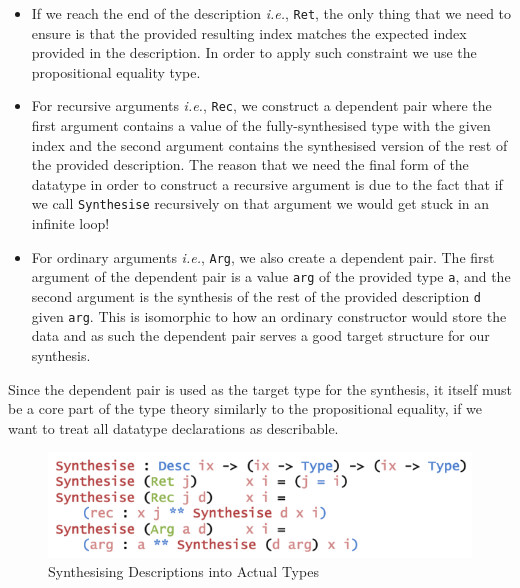\documentclass{ituthesis}
\newcommand{\ttconstructor}[1]{\textcolor{constructor-color}{\texttt{#1}}}
\newcommand{\ttdec}[1]{\textcolor{declared-var-color}{\texttt{#1}}}
\newcommand{\ttvar}[1]{\textcolor{local-var-color}{\texttt{#1}}}
\theoremstyle{break}
\begin{document}
\begin{itemize}
  \item If we reach the end of the description \textit{i.e.}, \ttconstructor{Ret}, the only thing that we need to ensure is that the provided resulting index matches the expected index provided in the description. In order to apply such constraint we use the propositional equality type.
  \item For recursive arguments \textit{i.e.}, \ttconstructor{Rec}, we construct a dependent pair where the first argument contains a value of the fully-synthesised type with the given index and the second argument contains the synthesised version of the rest of the provided description. The reason that we need the final form of the datatype in order to construct a recursive argument is due to the fact that if we call \ttdec{Synthesise} recursively on that argument we would get stuck in an infinite loop!
  \item For ordinary arguments \textit{i.e.}, \ttconstructor{Arg}, we also create a dependent pair. The first argument of the dependent pair is a value \ttvar{arg} of the provided type \ttvar{a}, and the second argument is the synthesis of the rest of the provided description \ttvar{d} given \ttvar{arg}. This is isomorphic to how an ordinary constructor would store the data and as such the dependent pair serves a good target structure for our synthesis.
\end{itemize}
Since the dependent pair is used as the target type for the synthesis, it itself must be a core part of the type theory similarly to the propositional equality, if we want to treat all datatype declarations as describable.

\begin{figure}[ht]
\begin{center}
    \includegraphics[scale=0.5]{Figures/SynthesisingData.png}
\end{center}
\caption{Synthesising Descriptions into Actual Types}
\label{fig:synthdata}
\end{figure}
\end{document}
